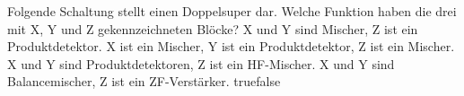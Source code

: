     {Folgende Schaltung stellt einen Doppelsuper dar. Welche Funktion haben die drei mit X, Y und Z gekennzeichneten Blöcke?}
    {X und Y sind Mischer, Z ist ein Produktdetektor.}
    {X ist ein Mischer, Y ist ein Produktdetektor, Z ist ein Mischer.}
    {X und Y sind Produktdetektoren, Z ist ein HF-Mischer.}
    {X und Y sind Balancemischer, Z ist ein ZF-Verstärker.}
    {true}{false}